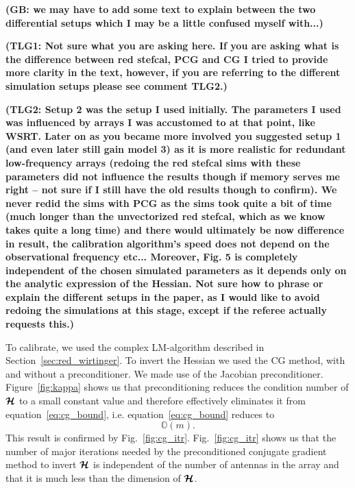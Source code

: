 \documentclass[useAMS,usenatbib]{mn2e}
\newcommand{\bmH}{\bmath{\mathcal{H}}}
\begin{document}
{\bf (GB: we may have to add some text to explain between the two differential setups which I may be a little confused myself with...)} 

{\bf (TLG1: Not sure what you are asking here. If you are asking what is the difference between red stefcal, PCG and CG I tried to provide more clarity in the text, however, if you 
are referring to the different simulation setups please see comment TLG2.)} 

{\bf (TLG2: Setup 2 was the setup I used initially. The parameters I used was influenced by arrays I was accustomed to at that point, like WSRT. Later on as you became more involved you suggested setup 1 (and even later still gain model 3) as it is more 
realistic for redundant low-frequency arrays (redoing the red stefcal sims with these parameters did not influence the results though if memory serves me right -- not sure if I still have the old results though to confirm). We never redid the sims with PCG as the sims took quite a bit of time (much 
longer than the unvectorized red stefcal, which as we know takes quite a long time) and there 
would ultimately be now difference in result, the calibration algorithm's speed does not depend on the observational frequency etc... Moreover, 
Fig. 5 is completely independent of the chosen simulated parameters as it depends only on the analytic expression of the Hessian. Not sure 
how to phrase or explain the different setups in the paper, as I would like to avoid redoing the simulations at this stage, except if the referee actually requests this.)}

To calibrate, we used the complex LM-algorithm described in Section~\ref{sec:red_wirtinger}. To invert the 
Hessian we used the CG method, with and without a preconditioner. We made use of the Jacobian preconditioner. 
Figure~\ref{fig:kappa} shows us that preconditioning reduces the condition number of $\bmH$ to a small constant value and therefore effectively eliminates
it from equation~\ref{eq:cg_bound}, i.e. equation~\ref{eq:cg_bound} reduces to
\begin{equation}
\label{eq:cg_bound2}
\mathbb{O}(m). 
\end{equation}
This result is confirmed by Fig.~\ref{fig:cg_itr}. Fig.~\ref{fig:cg_itr} 
shows us that the number of major iterations needed by the preconditioned conjugate gradient method to invert 
$\bmH$ is independent of the number of antennas in the array and that it is much less than the 
dimension of $\bmH$. 
\end{document}
